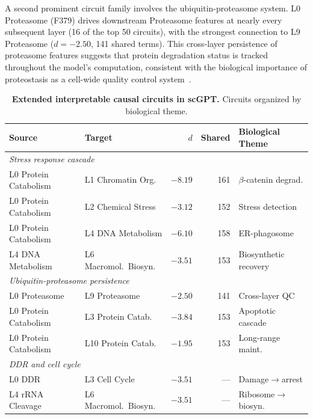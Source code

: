 \documentclass[onecolumn]{article}
\begin{document}
A second prominent circuit family involves the ubiquitin-proteasome system. L0 Proteasome (F379) drives downstream Proteasome features at nearly every subsequent layer (16 of the top 50 circuits), with the strongest connection to L9 Proteasome ($d = -2.50$, 141 shared terms). This cross-layer persistence of proteasome features suggests that protein degradation status is tracked throughout the model's computation, consistent with the biological importance of proteostasis as a cell-wide quality control system~\citep{labbadia2015proteostasis}.

\begin{table}[t]
\centering
\caption{\textbf{Extended interpretable causal circuits in scGPT.} Circuits organized by biological theme.}
\label{tab:circuits_scgpt}
\smallskip
\begin{tabular}{llrrl}
\toprule
Source & Target & $d$ & Shared & Biological Theme \\
\midrule
\multicolumn{5}{l}{\emph{Stress response cascade}} \\
L0 Protein Catabolism & L1 Chromatin Org. & $-8.19$ & 161 & $\beta$-catenin degrad. \\
L0 Protein Catabolism & L2 Chemical Stress & $-3.12$ & 152 & Stress detection \\
L0 Protein Catabolism & L4 DNA Metabolism & $-6.10$ & 158 & ER-phagosome \\
L4 DNA Metabolism & L6 Macromol.\ Biosyn. & $-3.51$ & 153 & Biosynthetic recovery \\
\midrule
\multicolumn{5}{l}{\emph{Ubiquitin-proteasome persistence}} \\
L0 Proteasome & L9 Proteasome & $-2.50$ & 141 & Cross-layer QC \\
L0 Protein Catabolism & L3 Protein Catab. & $-3.84$ & 153 & Apoptotic cascade \\
L0 Protein Catabolism & L10 Protein Catab. & $-1.95$ & 153 & Long-range maint. \\
\midrule
\multicolumn{5}{l}{\emph{DDR and cell cycle}} \\
L0 DDR & L3 Cell Cycle & $-3.51$ & --- & Damage$\to$arrest \\
L4 rRNA Cleavage & L6 Macromol.\ Biosyn. & $-3.51$ & --- & Ribosome$\to$biosyn. \\
\bottomrule
\end{tabular}
\end{table}
\end{document}
